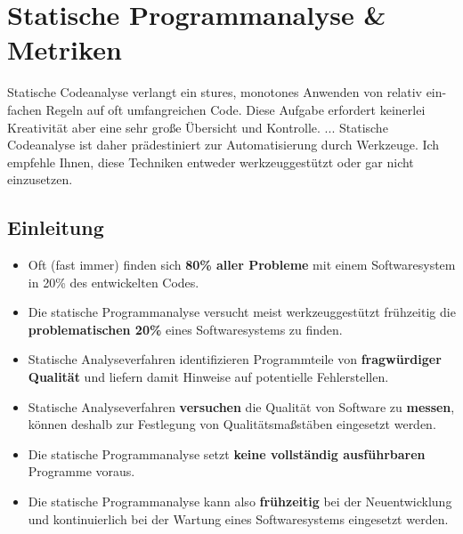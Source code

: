 \section{Statische Programmanalyse \& Metriken}
Statische Codeanalyse verlangt ein stures, monotones Anwenden von relativ ein-
fachen Regeln auf oft umfangreichen Code. Diese Aufgabe erfordert keinerlei Kreativität aber eine sehr große Übersicht und Kontrolle. ... Statische Codeanalyse ist daher prädestiniert zur Automatisierung durch Werkzeuge. Ich empfehle Ihnen, diese Techniken entweder werkzeuggestützt oder gar nicht einzusetzen.

\subsection{Einleitung}
\begin{itemize}
	\item Oft (fast immer) finden sich \textbf{80\% aller Probleme} mit einem Softwaresystem in 20\% des entwickelten Codes. 
	\item Die statische Programmanalyse versucht meist werkzeuggestützt frühzeitig die \textbf{problematischen 20\%} eines Softwaresystems zu finden.
	\item Statische Analyseverfahren identifizieren Programmteile von \textbf{fragwürdiger Qualität} und liefern damit Hinweise auf potentielle Fehlerstellen.
	\item Statische Analyseverfahren \textbf{versuchen} die Qualität von Software zu \textbf{messen}, können deshalb zur Festlegung von Qualitätsmaßstäben eingesetzt werden.
	\item Die statische Programmanalyse setzt \textbf{keine vollständig ausführbaren} Programme voraus.
	\item Die statische Programmanalyse kann also \textbf{frühzeitig} bei der Neuentwicklung und kontinuierlich bei der Wartung eines Softwaresystems eingesetzt werden.
\end{itemize}

